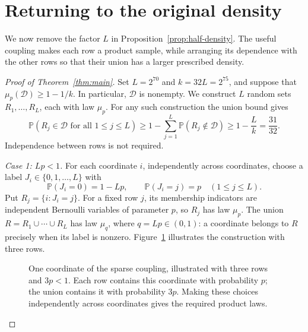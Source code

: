 \documentclass[11pt,letterpaper]{article}
\theoremstyle{definition}
\theoremstyle{remark}
\numberwithin{equation}{section}
\begin{document}
\section{Returning to the original density}
\label{sec:density}

We now remove the factor $L$ in Proposition~\ref{prop:half-density}.
The useful coupling makes each row a product sample, while arranging
its dependence with the other rows so that their union has a larger
prescribed density.

\begin{proof}[Proof of Theorem~\ref{thm:main}]
Set $L=2^{70}$ and $k=32L=2^{75}$, and suppose that
$\mu_p(\mathcal D)\ge1-1/k$. In particular, $\mathcal D$ is nonempty.
We construct $L$ random sets $R_1,\ldots,R_L$, each with law $\mu_p$.
For any such construction the union bound gives
\begin{equation}
\label{eq:all-good-rows}
\mathbb P(R_j\in\mathcal D\text{ for all }1\le j\le L)
\ge1-\sum_{j=1}^L\mathbb P(R_j\notin\mathcal D)
\ge1-\frac Lk=\frac{31}{32}.
\end{equation}
Independence between rows is not required.

\medskip
\noindent\emph{Case 1: $Lp<1$.}
For each coordinate $i$, independently across coordinates, choose a label
$J_i\in\{0,1,\ldots,L\}$ with
\[
\mathbb P(J_i=0)=1-Lp,
\qquad
\mathbb P(J_i=j)=p\quad(1\le j\le L).
\]
Put $R_j=\{i:J_i=j\}$. For a fixed row $j$, its membership indicators
are independent Bernoulli variables of parameter $p$, so $R_j$ has law
$\mu_p$. The union $R=R_1\cup\cdots\cup R_L$ has law $\mu_q$,
where $q=Lp\in(0,1)$: a coordinate belongs to $R$ precisely when
its label is nonzero.
Figure~\ref{fig:coupling} illustrates the construction with three rows.

\begin{figure}[!ht]
\centering
{}
\caption{One coordinate of the sparse coupling, illustrated with three
rows and $3p<1$. Each row contains this coordinate with probability $p$;
the union contains it with probability $3p$. Making these choices
independently across coordinates gives the required product laws.}
\label{fig:coupling}
\end{figure}



\end{proof}
\end{document}
